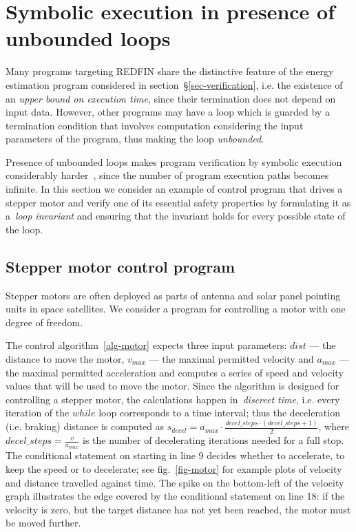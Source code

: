 \section{Symbolic execution in presence of unbounded loops\label{sec-motor-control}}

Many programs targeting REDFIN share the distinctive feature of
the energy estimation program considered in section~\S\ref{sec-verification},
i.e. the existence of an  \emph{upper bound on execution time},
since their termination does not depend on input data.
However, other programs may have a loop
which is guarded by a termination condition that involves computation
considering the input parameters of the program, thus making the loop
\emph{unbounded}.

Presence of unbounded loops makes program verification by symbolic execution considerably
harder~\cite[p.~50:20]{SurveySymExec-CSUR18}, since the number of program execution
paths becomes infinite. In this section we consider an example
of control program that drives a stepper motor and verify one of its essential
safety properties by formulating it as a~\emph{loop invariant} and ensuring that the
invariant holds for every possible state of the loop.

\subsection{Stepper motor control program}

Stepper motors are often deployed as parts of antenna and solar panel pointing units
in space satellites. We consider a program for controlling a motor with
one degree of freedom.

The control algorithm~\ref{alg-motor} expects three input
parameters: $dist$ --- the distance to move the motor, $v_{max}$ --- the maximal permitted
velocity and $a_{max}$ --- the maximal permitted acceleration and computes a series of
speed and velocity values that will be used to move the motor. Since the algorithm is
designed for controlling a stepper motor, the calculations happen in~\emph{discreet time},
i.e. every iteration of the $while$ loop corresponds to a time interval; thus
the deceleration (i.e. braking) distance is computed as
$s_{decel} = a_{max} \cdot \frac{decel\_steps \cdot (decel\_steps + 1)}{2}$, where
$decel\_steps = \frac{v}{a_{max}}$ is the number of decelerating iterations
needed for a full stop. The conditional statement on starting in line 9 decides whether
to accelerate, to keep the speed or to decelerate;
see fig.~\ref{fig-motor} for example plots of velocity and distance travelled
against time. The spike on the bottom-left of the velocity graph illustrates
the edge covered by the conditional statement on line 18: if the velocity is zero, but the target
distance has not yet been reached, the motor must be moved further.

